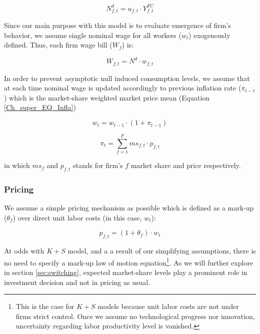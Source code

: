 \documentclass{SelfArx}
\begin{document}
\begin{latex}
\begin{equation}
N^{d}_{f,t} = u_{f,t}\cdot Y^{FC}_{f,t}
\end{equation}
\end{latex}

Since our main purpose with this model is to evaluate emergence of firm's behavior, we assume single nominal wage for all workers (\(w_{t}\)) exogenously defined.
Thus, each firm wage bill (\(W_{f}\)) is:
\begin{latex}
\begin{equation}
W_{f,t} = N^{d}\cdot w_{f,t}
\end{equation}
\end{latex}
In order to prevent asymptotic null induced consumption levels, we assume that at each time nominal wage is updated accordingly to previous inflation rate (\(\pi_{t-t}\)) which is the market-share weighted market price mean (Equation \ref{Ch_super_EQ_Infla})

\begin{latex}
\begin{equation}
w_{t} = w_{t-1}\cdot(1+\pi_{t-1})
\end{equation}
\end{latex}
\begin{latex}
\begin{equation}
\label{Ch_super_EQ_Infla}
\pi_{t} = \sum_{f=1}^{F} ms_{f,t}\cdot p_{f,t}
\end{equation}
\end{latex}
in which \(ms_{f}\) and \(p_{f,t}\) stands for firm's \(f\) market share and price respectively.



\subsubsection{Pricing}
\label{sec:org21e220e}

We assume a simple pricing mechanism as possible which is defined as a mark-up (\(\theta_{f}\)) over direct unit labor costs (in this case, \(w_{t}\)):
\begin{latex}
\begin{equation}
p_{f,t} = (1+\theta_{f})\cdot w_{t}
\end{equation}
\end{latex}
At odds with \(K+S\) model, and a a result of our simplifying assumptions, there is no need to specify a mark-up law of motion equation\footnote{This is the case for \(K+S\) models because unit labor costs are not under firms strict control. Once we assume no technological progress nor innovation, uncertainty regarding labor productivity level is vanished.}.
As we will further explore in section \ref{sec:switching}, expected market-share levels play a prominent role in investment decision and not in pricing as usual.
\end{document}
